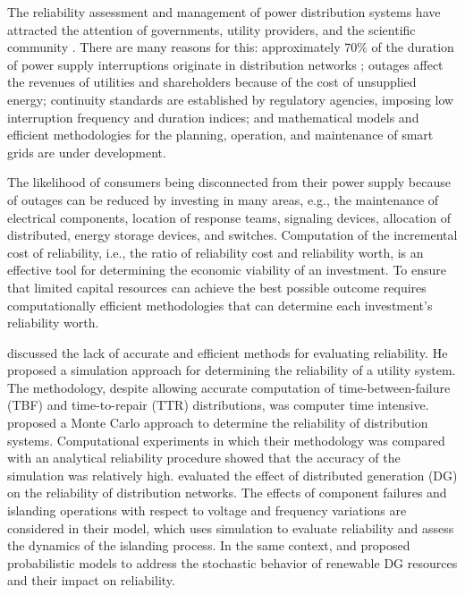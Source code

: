 The reliability assessment and management of power distribution systems have attracted the attention of governments, utility providers, and the scientific community 
\cite{EscaleraProdanovicCastronuovoRoldanPerez2020}.
There are many reasons for this: approximately $70\%$ of the duration of power supply interruptions originate in distribution networks \cite{billinton}; outages affect the revenues of utilities and shareholders because of the cost of unsupplied energy; continuity standards are established by regulatory agencies, imposing low interruption frequency and duration indices; and mathematical models and efficient methodologies for the planning, operation, and maintenance of smart grids are under development.

The likelihood of consumers being disconnected from their power supply because of outages can be reduced by investing in many areas, e.g., the maintenance of electrical components, location of response teams, signaling devices, allocation of distributed, energy storage devices, and switches.
Computation of the incremental cost of reliability, i.e., the ratio of reliability cost and reliability worth, is an effective tool for determining the economic viability of an investment. 
To ensure that limited capital resources can achieve the best possible outcome requires computationally efficient methodologies that can determine each investment's reliability worth.

\cite{chismant1998} discussed the lack of accurate and efficient methods for evaluating reliability. He proposed a simulation approach for determining the reliability of a utility system. The methodology, despite allowing accurate computation of time-between-failure (TBF) and time-to-repair (TTR) distributions, was computer time intensive.
\cite{Heydt2010}  proposed a Monte Carlo approach to determine the reliability of distribution systems. Computational experiments in which their methodology was compared with an analytical reliability procedure showed that the accuracy of the simulation was relatively high.
\cite{RochaEtal2017} evaluated the effect of distributed generation (DG) on the reliability of distribution networks. The effects of component failures and islanding operations with respect to voltage and frequency variations are considered in their model, which uses simulation to evaluate reliability and assess the dynamics of the islanding process. 
In the same context, \cite{ContiNicolosiRizzo2012} and \cite{AdefaratiBansal2017} proposed probabilistic models to address the stochastic behavior of renewable DG resources and their impact on reliability. 


